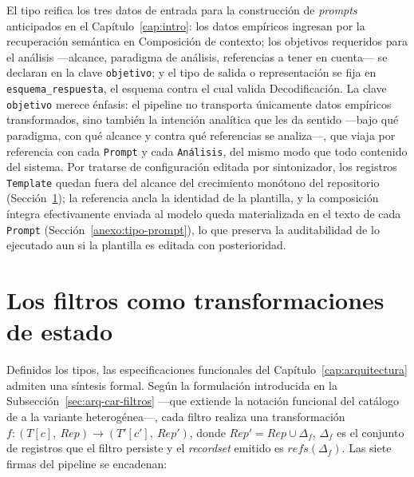 \documentclass[12pt]{report}
\begin{document}
El tipo reifica los tres datos de entrada para la construcción de \textit{prompts} anticipados en el Capítulo~\ref{cap:intro}: los datos empíricos ingresan por la recuperación semántica en Composición de contexto; los objetivos requeridos para el análisis ---alcance, paradigma de análisis, referencias a tener en cuenta--- se declaran en la clave \texttt{objetivo}; y el tipo de salida o representación se fija en \texttt{esquema\_respuesta}, el esquema contra el cual valida Decodificación. La clave \texttt{objetivo} merece énfasis: el pipeline no transporta únicamente datos empíricos transformados, sino también la intención analítica que les da sentido ---bajo qué paradigma, con qué alcance y contra qué referencias se analiza---, que viaja por referencia con cada \texttt{Prompt} y cada \texttt{Análisis}, del mismo modo que todo contenido del sistema. Por tratarse de configuración editada por sintonizador, los registros \texttt{Template} quedan fuera del alcance del crecimiento monótono del repositorio (Sección~\ref{anexo:tipos-firmas}); la referencia ancla la identidad de la plantilla, y la composición íntegra efectivamente enviada al modelo queda materializada en el texto de cada \texttt{Prompt} (Sección~\ref{anexo:tipo-prompt}), lo que preserva la auditabilidad de lo ejecutado aun si la plantilla es editada con posterioridad.

\section{Los filtros como transformaciones de estado}
\label{anexo:tipos-firmas}

Definidos los tipos, las especificaciones funcionales del Capítulo~\ref{cap:arquitectura} admiten una síntesis formal. Según la formulación introducida en la Subsección~\ref{sec:arq-car-filtros} ---que extiende la notación funcional del catálogo de \citet[p.~24]{cristia:2025} a la variante heterogénea---, cada filtro realiza una transformación \(f : (T[c],\ \mathit{Rep}) \to (T'[c'],\ \mathit{Rep}')\), donde \(\mathit{Rep}' = \mathit{Rep} \cup \Delta_f\), \(\Delta_f\) es el conjunto de registros que el filtro persiste y el \textit{recordset} emitido es \(\mathit{refs}(\Delta_f)\). Las siete firmas del pipeline se encadenan:
\end{document}
